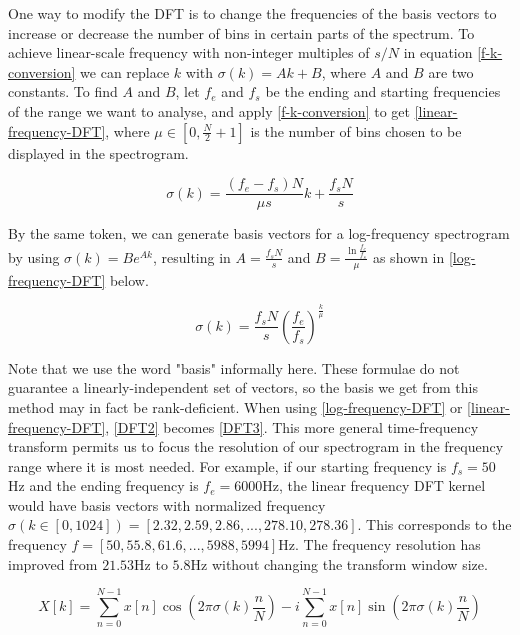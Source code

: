 \documentclass{ieeeaccess}
\begin{document}
 
One way to modify the DFT is to change the frequencies of the basis vectors to increase or decrease the number of bins in certain parts of the spectrum. To achieve linear-scale frequency with non-integer multiples of $s/N$ in equation \eqref{f-k-conversion} we can replace $k$ with $\sigma(k) = Ak + B$, where $A$ and $B$ are two constants. To find $A$ and $B$, let $f_e$ and $f_s$ be the ending and starting frequencies of the range we want to analyse, and apply \eqref{f-k-conversion} to get \eqref{linear-frequency-DFT}, where $\mu \in \left[0, \frac{N}{2}+1 \right]$ is the number of bins chosen to be displayed in the spectrogram.

\begin{equation}
 \sigma(k) = \frac{(f_e-f_s)N}{\mu s}k + \frac{f_s N}{s}\label{linear-frequency-DFT}
\end{equation}


By the same token, we can generate basis vectors for a log-frequency spectrogram by using $\sigma(k) = Be^{Ak}$, resulting in $A=\frac{f_sN}{s}$ and $B=\frac{\ln{\frac{f_e}{f_s}}}{\mu}$ as shown in \eqref{log-frequency-DFT} below.


\begin{equation}
 \sigma(k) = \frac{f_s N}{s}\left(\frac{f_e}{f_s}\right)^\frac{k}{\mu} \label{log-frequency-DFT}
\end{equation}


Note that we use the word "basis" informally here. These formulae do not guarantee a linearly-independent set of vectors, so the basis we get from this method may in fact be rank-deficient. When using \eqref{log-frequency-DFT} or \eqref{linear-frequency-DFT}, \eqref{DFT2} becomes \eqref{DFT3}. This more general time-frequency transform permits us to focus the resolution of our spectrogram in the frequency range where it is most needed. For example, if our starting frequency is $f_s=50$Hz and the ending frequency is $f_e=6000$Hz, the linear frequency DFT kernel would have basis vectors with normalized frequency $\sigma(k \in [0,1024]) = [2.32,2.59,2.86, ..., 278.10,278.36]$. This corresponds to the frequency $f=[50,55.8,61.6,..., 5988,5994]$Hz. The frequency resolution has improved from $21.53$Hz to $5.8$Hz without changing the transform window size. 


\begin{equation} X[k] = \sum_{n=0}^{N-1}x[n] \cos(2\pi \sigma(k) \frac{n}{N}) - i \sum_{n=0}^{N-1}x[n]\sin(2\pi \sigma(k) \frac{n}{N})\label{DFT3}\end{equation}
\end{document}
